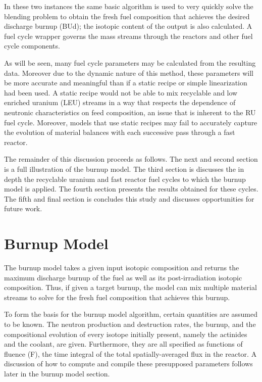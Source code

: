 In these two instances the same basic algorithm is used to very quickly solve the blending problem 
to obtain the fresh fuel composition that achieves the desired discharge burnup (BUd); the isotopic 
content of the output is also calculated.   A fuel cycle wrapper governs the mass streams through 
the reactors and other fuel cycle components.  

As will be seen, many fuel cycle parameters may be calculated from the resulting data.  Moreover 
due to the dynamic nature of this method, these parameters will be more accurate and meaningful 
than if a static recipe or simple linearization had been used.  A static recipe would not be able 
to mix recyclable and low enriched uranium (LEU) streams in a way that respects the dependence of 
neutronic characteristics on feed composition, an issue that is inherent to the RU fuel cycle.  
Moreover, models that use static recipes may fail to accurately capture the evolution of material 
balances with each successive pass through a fast reactor.   

The remainder of this discussion proceeds as follows. The next and second section is a 
full illustration of the burnup model.  The third section is discusses the in depth the recyclable 
uranium and fast reactor fuel cycles to which the burnup model is applied.  The fourth section 
presents the results obtained for these cycles.  The fifth and final section is concludes this 
study and discusses opportunities for future work. 




\section{Burnup Model}
\label{1g_sec:bu_model}
The burnup model takes a given input isotopic composition and returns the maximum discharge 
burnup of the fuel as well as its post-irradiation isotopic composition.  Thus, if given a 
target burnup, the model can mix multiple material streams to solve for the fresh fuel composition 
that achieves this burnup.

To form the basis for the burnup model algorithm, certain quantities are assumed to be known.  
The neutron production and destruction rates, the burnup, and the compositional evolution of 
every isotope initially present, namely the actinides and the coolant, are given.  Furthermore, 
they are all specified as functions of fluence (F), the time integral of the total spatially-averaged 
flux in the reactor. A discussion of how to compute and compile these presupposed parameters follows 
later in the burnup model section. 


